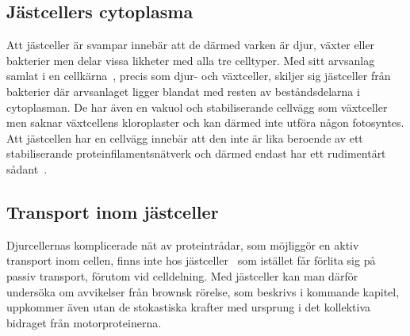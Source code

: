 \subsection{Jästcellers cytoplasma}
Att jästceller är svampar innebär att de därmed varken är djur, växter eller bakterier men delar vissa likheter med alla tre celltyper. Med sitt arvsanlag samlat i en cellkärna~\cite{SGD_yeast}, precis som djur- och växtceller, skiljer sig jästceller från bakterier där arvsanlaget ligger blandat med resten av beståndsdelarna i cytoplasman.
De har även en vakuol och stabiliserande cellvägg som växtceller men saknar växtcellens kloroplaster och kan därmed inte utföra någon fotosyntes. Att jästcellen har en cellvägg innebär att den inte är lika beroende av ett stabiliserande proteinfilamentsnätverk och därmed endast har ett rudimentärt sådant~\cite{Midtveldt_etal2016}.

\subsection{Transport inom jästceller}
Djurcellernas komplicerade nät av proteintrådar, som möjliggör en aktiv transport inom cellen, finns inte hos jästceller~\cite{Midtveldt_etal2016} som istället får förlita sig på passiv transport, förutom vid celldelning. 
Med jästceller kan man därför undersöka om avvikelser från brownsk rörelse, som beskrivs i kommande kapitel, uppkommer även utan de stokastiska krafter med ursprung i det kollektiva bidraget från motorproteinerna.



